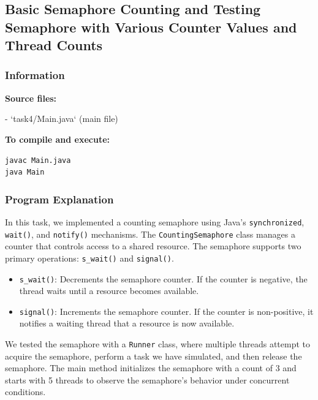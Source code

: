 \documentclass{article}
\begin{document}
\subsection{Basic Semaphore Counting and Testing Semaphore with Various Counter Values and Thread Counts}

\subsubsection{Information}
\textbf{Source files:}

- `task4/Main.java` (main file)

\textbf{To compile and execute:}
\begin{lstlisting}[style=bash]
javac Main.java
java Main
\end{lstlisting}

\subsubsection{Program Explanation}
In this task, we implemented a counting semaphore using Java's \texttt{synchronized}, \texttt{wait()}, and \texttt{notify()} mechanisms. The \texttt{CountingSemaphore} class manages a counter that controls access to a shared resource. The semaphore supports two primary operations: \texttt{s\_wait()} and \texttt{signal()}.

\begin{itemize}
    \item \texttt{s\_wait()}: Decrements the semaphore counter. If the counter is negative, the thread waits until a resource becomes available.
    \item \texttt{signal()}: Increments the semaphore counter. If the counter is non-positive, it notifies a waiting thread that a resource is now available.
\end{itemize}

We tested the semaphore with a \texttt{Runner} class, where multiple threads attempt to acquire the semaphore, perform a task we have simulated, and then release the semaphore. The main method initializes the semaphore with a count of 3 and starts with 5 threads to observe the semaphore's behavior under concurrent conditions.
\end{document}

